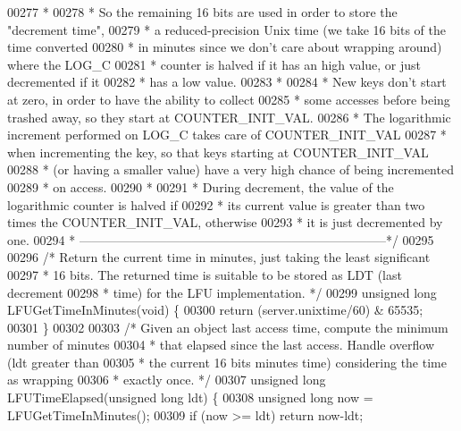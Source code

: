 \begin{DoxyCode}
00277 \textcolor{comment}{ *}
00278 \textcolor{comment}{ * So the remaining 16 bits are used in order to store the "decrement time",}
00279 \textcolor{comment}{ * a reduced-precision Unix time (we take 16 bits of the time converted}
00280 \textcolor{comment}{ * in minutes since we don't care about wrapping around) where the LOG\_C}
00281 \textcolor{comment}{ * counter is halved if it has an high value, or just decremented if it}
00282 \textcolor{comment}{ * has a low value.}
00283 \textcolor{comment}{ *}
00284 \textcolor{comment}{ * New keys don't start at zero, in order to have the ability to collect}
00285 \textcolor{comment}{ * some accesses before being trashed away, so they start at COUNTER\_INIT\_VAL.}
00286 \textcolor{comment}{ * The logarithmic increment performed on LOG\_C takes care of COUNTER\_INIT\_VAL}
00287 \textcolor{comment}{ * when incrementing the key, so that keys starting at COUNTER\_INIT\_VAL}
00288 \textcolor{comment}{ * (or having a smaller value) have a very high chance of being incremented}
00289 \textcolor{comment}{ * on access.}
00290 \textcolor{comment}{ *}
00291 \textcolor{comment}{ * During decrement, the value of the logarithmic counter is halved if}
00292 \textcolor{comment}{ * its current value is greater than two times the COUNTER\_INIT\_VAL, otherwise}
00293 \textcolor{comment}{ * it is just decremented by one.}
00294 \textcolor{comment}{ * --------------------------------------------------------------------------*/}
00295 
00296 \textcolor{comment}{/* Return the current time in minutes, just taking the least significant}
00297 \textcolor{comment}{ * 16 bits. The returned time is suitable to be stored as LDT (last decrement}
00298 \textcolor{comment}{ * time) for the LFU implementation. */}
00299 \textcolor{keywordtype}{unsigned} \textcolor{keywordtype}{long} LFUGetTimeInMinutes(\textcolor{keywordtype}{void}) \{
00300     \textcolor{keywordflow}{return} (server.unixtime/60) & 65535;
00301 \}
00302 
00303 \textcolor{comment}{/* Given an object last access time, compute the minimum number of minutes}
00304 \textcolor{comment}{ * that elapsed since the last access. Handle overflow (ldt greater than}
00305 \textcolor{comment}{ * the current 16 bits minutes time) considering the time as wrapping}
00306 \textcolor{comment}{ * exactly once. */}
00307 \textcolor{keywordtype}{unsigned} \textcolor{keywordtype}{long} LFUTimeElapsed(\textcolor{keywordtype}{unsigned} \textcolor{keywordtype}{long} ldt) \{
00308     \textcolor{keywordtype}{unsigned} \textcolor{keywordtype}{long} now = LFUGetTimeInMinutes();
00309     \textcolor{keywordflow}{if} (now >= ldt) \textcolor{keywordflow}{return} now-ldt;

\end{DoxyCode}
